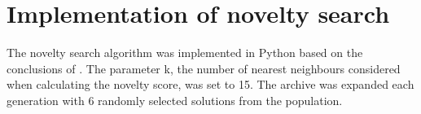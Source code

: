 \section{Implementation of novelty search}
The novelty search algorithm was implemented in Python based on the conclusions of \cite{ns_study}.
The parameter k, the number of nearest neighbours considered when calculating the novelty score,
was set to 15. The archive was expanded each generation with $6$ randomly selected
solutions from the population.